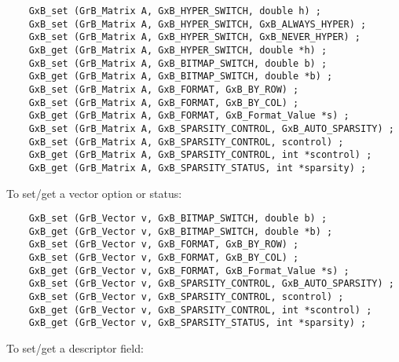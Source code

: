 \documentclass[12pt]{article}
\begin{document}
{    {\footnotesize
    \begin{verbatim}
    GxB_set (GrB_Matrix A, GxB_HYPER_SWITCH, double h) ;
    GxB_set (GrB_Matrix A, GxB_HYPER_SWITCH, GxB_ALWAYS_HYPER) ;
    GxB_set (GrB_Matrix A, GxB_HYPER_SWITCH, GxB_NEVER_HYPER) ;
    GxB_get (GrB_Matrix A, GxB_HYPER_SWITCH, double *h) ;
    GxB_set (GrB_Matrix A, GxB_BITMAP_SWITCH, double b) ;
    GxB_get (GrB_Matrix A, GxB_BITMAP_SWITCH, double *b) ;
    GxB_set (GrB_Matrix A, GxB_FORMAT, GxB_BY_ROW) ;
    GxB_set (GrB_Matrix A, GxB_FORMAT, GxB_BY_COL) ;
    GxB_get (GrB_Matrix A, GxB_FORMAT, GxB_Format_Value *s) ;
    GxB_set (GrB_Matrix A, GxB_SPARSITY_CONTROL, GxB_AUTO_SPARSITY) ;
    GxB_set (GrB_Matrix A, GxB_SPARSITY_CONTROL, scontrol) ;
    GxB_get (GrB_Matrix A, GxB_SPARSITY_CONTROL, int *scontrol) ;
    GxB_get (GrB_Matrix A, GxB_SPARSITY_STATUS, int *sparsity) ; \end{verbatim} }

\noindent
To set/get a vector option or status:

    {\footnotesize
    \begin{verbatim}
    GxB_set (GrB_Vector v, GxB_BITMAP_SWITCH, double b) ;
    GxB_get (GrB_Vector v, GxB_BITMAP_SWITCH, double *b) ;
    GxB_set (GrB_Vector v, GxB_FORMAT, GxB_BY_ROW) ;
    GxB_set (GrB_Vector v, GxB_FORMAT, GxB_BY_COL) ;
    GxB_get (GrB_Vector v, GxB_FORMAT, GxB_Format_Value *s) ;
    GxB_set (GrB_Vector v, GxB_SPARSITY_CONTROL, GxB_AUTO_SPARSITY) ;
    GxB_set (GrB_Vector v, GxB_SPARSITY_CONTROL, scontrol) ;
    GxB_get (GrB_Vector v, GxB_SPARSITY_CONTROL, int *scontrol) ;
    GxB_get (GrB_Vector v, GxB_SPARSITY_STATUS, int *sparsity) ; \end{verbatim} }

\noindent
To set/get a descriptor field:

}
\end{document}
